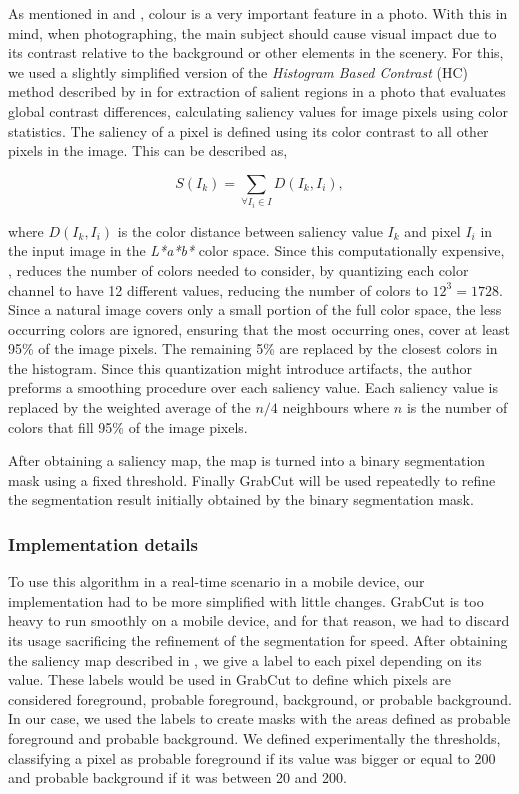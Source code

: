 As mentioned in \cite{Santos} and \cite{kamps2012rules}, colour is a very important feature in a photo. With this in mind, when photographing, the main subject should cause visual impact due to its contrast relative to the background or other elements in the scenery. For this, we used a slightly simplified version of the \emph{Histogram Based Contrast} (HC) method described by \citeauthor{cheng2011global} in \cite{cheng2011global} for extraction of salient regions in a photo that evaluates global contrast differences, calculating saliency values for image pixels using color statistics. The saliency of a pixel is defined using its color contrast to all other pixels in the image. This can be described as,

\begin{equation}
S(I_{k}) = \sum_{\forall I_{i} \in I} D(I_{k}, I_{i}),
\end{equation}

where $D(I_{k}, I_{i})$ is the color distance between saliency value $I_{k}$ and pixel $I_{i}$ in the input image in the \emph{L*a*b*} color space. Since this computationally expensive, \citeauthor{cheng2011global}, reduces the number of colors needed to consider, by quantizing each color channel to have 12 different values, reducing the number of colors to $12^{3} = 1728$. Since a natural image covers only a small portion of the full color space, the less occurring colors are ignored, ensuring that the most occurring ones, cover at least 95\% of the image pixels. The remaining 5\% are replaced by the closest colors in the histogram. Since this quantization might introduce artifacts, the author preforms a smoothing procedure over each saliency value. Each saliency value is replaced by the weighted average of the $n/4$ neighbours where $n$ is the number of colors that fill 95\% of the image pixels.

After obtaining a saliency map, the map is turned into a binary segmentation mask using a fixed threshold. Finally GrabCut\cite{rother2004grabcut} will be used repeatedly to refine the segmentation result initially obtained by the binary segmentation mask.

\subsubsection{Implementation details}

To use this algorithm in a real-time scenario in a mobile device, our implementation had to be more simplified with little changes. GrabCut is too heavy to run smoothly on a mobile device, and for that reason, we had to discard its usage sacrificing the refinement of the segmentation for speed. After obtaining the saliency map described in \cite{cheng2011global}, we give a label to each pixel depending on its value. These labels would be used in GrabCut to define which pixels are considered foreground, probable foreground, background, or probable background. In our case, we used the labels to create masks with the areas defined as probable foreground and probable background.
We defined experimentally the thresholds, classifying a pixel as probable foreground if its value was bigger or equal to 200 and probable background if it was between 20 and 200.

